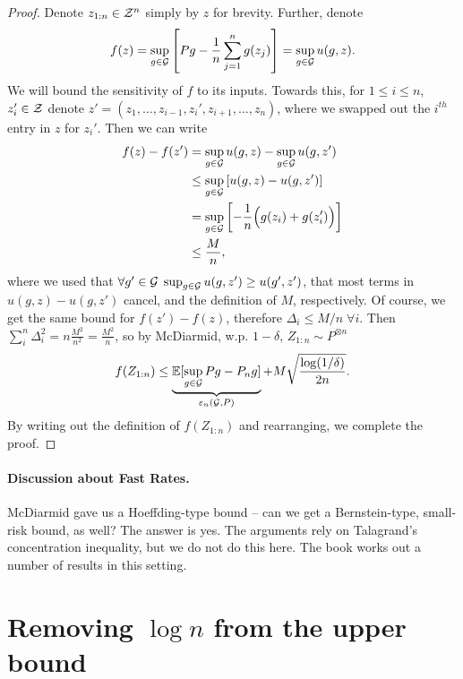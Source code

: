 \documentclass[twoside]{article}
\newcommand{\zn}{z_{1:n}}
\newcommand{\supg}{\sup_{g \in \cG}}
\begin{document}
\begin{proof}
    Denote $\zn \in \cZ^n$ simply by $z$ for brevity. Further, denote
    \begin{equation*}
        f(z) = \supg \left[ Pg - \frac1n \sum_{j=1}^n g(z_j) \right] = \supg u(g,z).
    \end{equation*}
    We will bound the sensitivity of $f$ to its inputs. Towards this, for $1 \leq i \leq n$, $z_i' \in \mathcal{Z}$ denote $z' = (z_1, \dotsc, z_{i-1}, z_i', z_{i+1}, \dotsc, z_n)$, where we swapped out the $i^{th}$ entry in $z$ for $z_i'$. Then we can write
    \begin{align*}
        f(z) - f(z') & = \supg u(g,z) - \supg u(g,z')  \\
            & \leq \supg  \left[ u(g,z) - u(g,z')  \right]  \\
            & = \supg \left[ - \frac1n \Big( g(z_i) + g(z_i') \Big)  \right]  \\
            & \leq \frac{M}{n},
    \end{align*}
    where we used that $\forall g' \in \cG \; \supg u(g, z') \geq u(g', z')$, that most terms in $u(g,z)-u(g,z')$ cancel, and the definition of $M$, respectively. Of course, we get the same bound for $f(z') - f(z)$, therefore $\Delta_i \leq M/n \; \forall i$. Then $\sum_i^n \Delta_i^2 = n \frac{M^2}{n^2} = \frac{M^2}{n}$, so by McDiarmid, w.p. $1-\delta$, $Z_{1:n} \sim P^{\otimes n}$
    \begin{equation*}
        f(Z_{1:n}) \leq \underbrace{\EE{\supg Pg - P_n g}}_{\varepsilon_n(\cG, P)} + M \sqrt{\frac{\log(1/\delta)}{2n}}.
    \end{equation*}
    By writing out the definition of $f(Z_{1:n})$ and rearranging, we complete the proof.
\end{proof}

\paragraph{Discussion about Fast Rates.}
McDiarmid gave us a Hoeffding-type bound -- can we get a Bernstein-type, small-risk bound, as well? The answer is yes. The arguments rely on Talagrand’s concentration inequality, but we do not do this here. The book works out a number of results in this setting.

\section{Removing $\log n$ from the upper bound}
\end{document}
